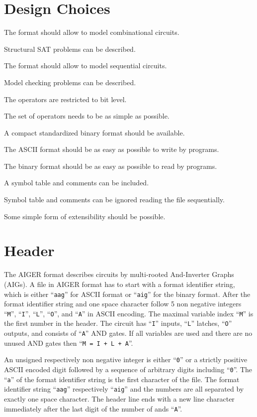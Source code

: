 \documentclass[10pt]{llncs}
\begin{document}
\section{Design Choices}
  
  The format should allow to model combinational circuits.

  Structural SAT problems can be described.
  
  The format should allow to model sequential circuits.

  Model checking problems can be described.

  The operators are restricted to bit level.

  The set of operators needs to be as simple as possible.

  A compact standardized binary format should be available.

  The ASCII format should be as easy as possible to write by programs.

  The binary format should be as easy as possible to read by programs.

  A symbol table and comments can be included.

  Symbol table and comments can be ignored reading the file sequentially.

  Some simple form of extensibility should be possible.

\section{Header}

  The AIGER format describes circuits by multi-rooted And-Inverter Graphs
  (AIGs).  A file in AIGER format has to start with a format identifier
  string, which is either ``\texttt{aag}'' for ASCII format or ``\texttt{aig}'' for the binary
  format.  After the format identifier string and one space character
  follow 5 non negative integers ``\texttt{M}'', ``\texttt{I}'', ``\texttt{L}'',
  ``\texttt{O}'', and ``\texttt{A}'' in ASCII
  encoding.  The maximal variable index ``\texttt{M}'' is the first number in the
  header.  The circuit has ``\texttt{I}'' inputs, ``\texttt{L}'' latches,
  ``\texttt{O}'' outputs, and
  consists of ``\texttt{A}'' AND gates.  If all variables are used and there are no
  unused AND gates then ``\texttt{M = I + L + A}''.

  An unsigned respectively non negative integer is either ``\texttt{0}'' or a strictly
  positive ASCII encoded digit followed by a sequence of arbitrary digits
  including ``\texttt{0}''.  The ``\texttt{a}'' of the format identifier string is the first
  character of the file.  The format identifier string ``\texttt{aag}'' respectively
  ``\texttt{aig}'' and the numbers are all separated by exactly one space character.
  The header line ends with a new line character immediately after the
  last digit of the number of ands ``\texttt{A}''.
\end{document}
